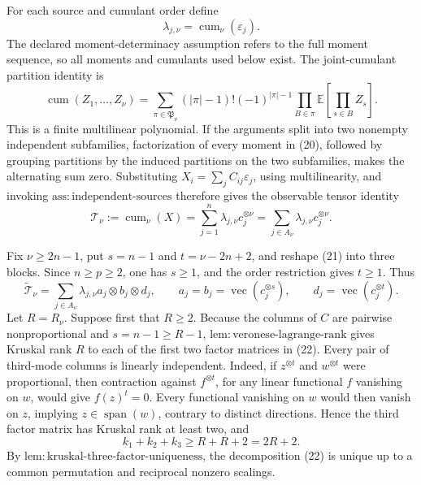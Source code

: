 For each source and cumulant order define
\[
 \lambda_{j,\nu}=\operatorname{cum}_\nu(\varepsilon_j).
\]
The declared moment-determinacy assumption refers to the full moment sequence, so all moments and cumulants used below exist. The joint-cumulant partition identity is
\[
 \operatorname{cum}(Z_1,\ldots,Z_\nu)
 =\sum_{\pi\in\mathfrak P_\nu}
 (|\pi|-1)!(-1)^{|\pi|-1}
 \prod_{B\in\pi}\mathbb E\!\left[\prod_{s\in B}Z_s\right]. \tag{20}
\]
This is a finite multilinear polynomial. If the arguments split into two nonempty independent subfamilies, factorization of every moment in (20), followed by grouping partitions by the induced partitions on the two subfamilies, makes the alternating sum zero. Substituting \(X_i=\sum_j C_{ij}\varepsilon_j\), using multilinearity, and invoking \(\mathrm{ass:independent\text{-}sources}\) therefore gives the observable tensor identity
\[
 \mathcal T_\nu:=\operatorname{cum}_\nu(X)
 =\sum_{j=1}^n\lambda_{j,\nu}c_j^{\otimes\nu}
 =\sum_{j\in A_\nu}\lambda_{j,\nu}c_j^{\otimes\nu}. \tag{21}
\]

Fix \(\nu\ge2n-1\), put \(s=n-1\) and \(t=\nu-2n+2\), and reshape (21) into three blocks. Since \(n\ge p\ge2\), one has \(s\ge1\), and the order restriction gives \(t\ge1\). Thus
\[
 \widetilde{\mathcal T}_\nu
 =\sum_{j\in A_\nu}\lambda_{j,\nu}
 a_j\otimes b_j\otimes d_j,
 \qquad
 a_j=b_j=\operatorname{vec}(c_j^{\otimes s}),
 \qquad
 d_j=\operatorname{vec}(c_j^{\otimes t}). \tag{22}
\]
Let \(R=R_\nu\). Suppose first that \(R\ge2\). Because the columns of \(C\) are pairwise nonproportional and \(s=n-1\ge R-1\), \(\mathrm{lem:veronese\text{-}lagrange\text{-}rank}\) gives Kruskal rank \(R\) to each of the first two factor matrices in (22). Every pair of third-mode columns is linearly independent. Indeed, if \(z^{\otimes t}\) and \(w^{\otimes t}\) were proportional, then contraction against \(f^{\otimes t}\), for any linear functional \(f\) vanishing on \(w\), would give \(f(z)^t=0\). Every functional vanishing on \(w\) would then vanish on \(z\), implying \(z\in\operatorname{span}(w)\), contrary to distinct directions. Hence the third factor matrix has Kruskal rank at least two, and
\[
 k_1+k_2+k_3\ge R+R+2=2R+2. \tag{23}
\]
By \(\mathrm{lem:kruskal\text{-}three\text{-}factor\text{-}uniqueness}\), the decomposition (22) is unique up to a common permutation and reciprocal nonzero scalings.

